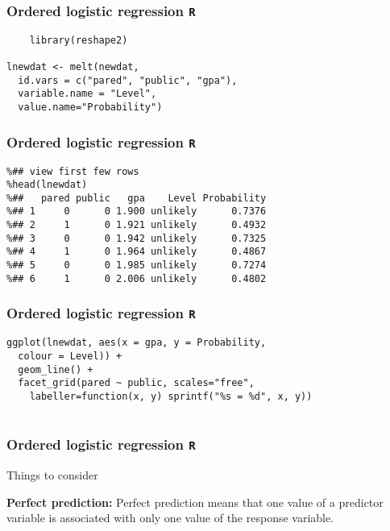\documentclass[00-GLMregslides.tex]{subfiles}
\begin{document}
\begin{frame}[fragile]
	\frametitle{Ordered logistic regression \texttt{R} }
\normalsize
\large
\begin{framed}
	\begin{verbatim}
	library(reshape2)
	
lnewdat <- melt(newdat, 
  id.vars = c("pared", "public", "gpa"),
  variable.name = "Level", 
  value.name="Probability")
\end{verbatim}
\end{framed}
\end{frame}
\begin{frame}[fragile]
	\frametitle{Ordered logistic regression \texttt{R} }
	\large
	\begin{framed}
		\begin{verbatim}
%## view first few rows
%head(lnewdat)
%##   pared public   gpa    Level Probability
%## 1     0      0 1.900 unlikely      0.7376
%## 2     1      0 1.921 unlikely      0.4932
%## 3     0      0 1.942 unlikely      0.7325
%## 4     1      0 1.964 unlikely      0.4867
%## 5     0      0 1.985 unlikely      0.7274
%## 6     1      0 2.006 unlikely      0.4802
\end{verbatim}
\end{framed}
\end{frame}
\begin{frame}[fragile]
	\frametitle{Ordered logistic regression \texttt{R} }
\large
\begin{framed}
\begin{verbatim}
ggplot(lnewdat, aes(x = gpa, y = Probability, 
  colour = Level)) +
  geom_line() +
  facet_grid(pared ~ public, scales="free",
    labeller=function(x, y) sprintf("%s = %d", x, y))
    
\end{verbatim}
\end{framed}

\end{frame}

\begin{frame}[fragile]
	\frametitle{Ordered logistic regression \texttt{R} }
	\Large
Things to consider

\textbf{Perfect prediction: }Perfect prediction means that one value of a predictor variable is associated with only one value of the response variable. 
\end{frame}
\end{document}
